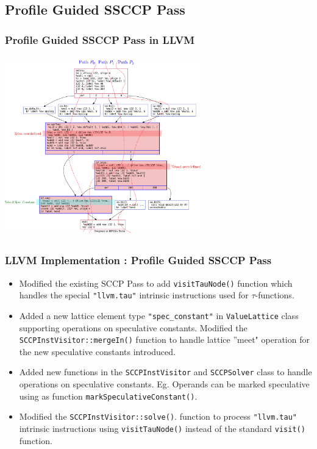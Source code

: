 \documentclass[aspectratio=169, compress]{beamer}
\begin{document}
\subsection{Profile Guided SSCCP Pass}
{
	
}

\begin{frame}
	\frametitle{Profile Guided SSCCP Pass in LLVM}
	\centering
	\includegraphics[width=8.5cm, height=7.8cm]{speculative.pdf} 
\end{frame}

\begin{frame}
	\frametitle{LLVM Implementation : Profile Guided SSCCP Pass}
	\begin{itemize}
		\item Modified the existing SCCP Pass to add \texttt{visitTauNode()} function which handles the special \texttt{"llvm.tau"} intrinsic instructions used for $\tau$-functions.\footnotemark
		\item Added a new lattice element type \texttt{"spec_constant"} in \texttt{ValueLattice} class supporting operations on speculative constants. Modified the \texttt{SCCPInstVisitor::mergeIn()} function to handle lattice ''meet" operation for the new speculative constants introduced.
		\item Added new functions in the \texttt{SCCPInstVisitor} and \texttt{SCCPSolver} class to handle operations on speculative constants. Eg. Operands can be marked speculative using as function \texttt{markSpeculativeConstant()}.
		\item Modified the \texttt{SCCPInstVisitor::solve()}. function to process \texttt{"llvm.tau"} intrinsic instructions using \texttt{visitTauNode()} instead of the standard \texttt{visit()} function.
	\end{itemize}
	\tiny 
\end{frame}
\footnotesize
\end{document}
